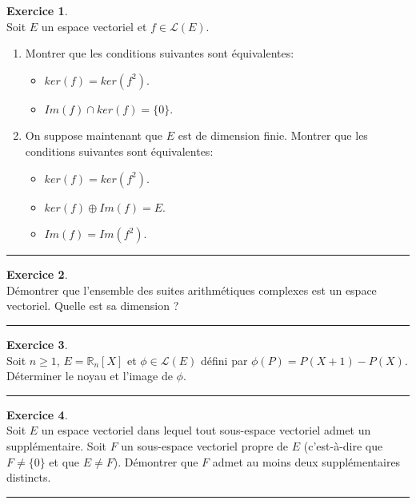 \documentclass[a4paper,10pt]{article}
\theoremstyle{definition}
\theoremstyle{definition}
\newtheorem{exo}{Exercice}
\newcommand{\R}{\mathbb{R}}
\begin{document}
\begin{minipage}{1\linewidth}
\begin{minipage}[t]{0.48\linewidth}
	\begin{exo}\quad\\
		Soit $E$ un espace vectoriel et $f\in\mathcal{L}(E)$.
		\begin{enumerate}
		\item Montrer que les conditions suivantes sont équivalentes:
		\begin{itemize}[$\square$]
		\item $ker(f) = ker(f^2)$.
		\item $ Im(f) \cap ker(f) = \{0\}$.
		\end{itemize}
		\item On suppose maintenant que $E$ est de dimension finie. Montrer que les conditions suivantes sont équivalentes:
		\begin{itemize}[$\square$]
			\item $ker(f) = ker(f^2)$.
			\item $ker(f) \oplus Im(f) = E$.
			\item $Im(f) = Im(f^2)$.
		\end{itemize}
		\end{enumerate}
		
		\centering
		\rule{1\linewidth}{0.6pt}
	\end{exo}

\begin{exo}\quad\\
	Démontrer que l'ensemble des suites arithmétiques complexes est un espace vectoriel. Quelle est sa dimension ? 
	
	\centering
	\rule{1\linewidth}{0.6pt}
\end{exo}

\begin{exo}\quad\\
	Soit $n\geq 1$, $E=\R_n[X]$ et $\phi\in\mathcal{L}(E)$ défini par $\phi(P) = P(X+1)-P(X)$. Déterminer le noyau et l'image de $\phi$. 

	
	\centering
	\rule{1\linewidth}{0.6pt}
\end{exo}

		\begin{exo}\quad\\
	Soit $E$ un espace vectoriel dans lequel tout sous-espace vectoriel admet un supplémentaire. Soit $F$ un sous-espace vectoriel propre de $E$ (c'est-à-dire que $F\neq \{0\}$ et que $E\neq F$). Démontrer que $F$ admet au moins deux supplémentaires distincts.
	
	\centering
	\rule{1\linewidth}{0.6pt}
\end{exo}



	
	\end{minipage}
\end{minipage}
\end{document}
